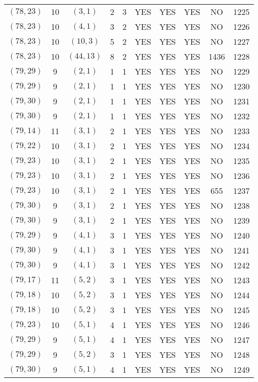 \begin{longtable}{|c|c|c|c|c|c|c|c|c|c|}
$(78, 23)$ & 10 & $(3, 1)$ & 2 & 3 & YES & YES & YES & NO & 1225\\
$(78, 23)$ & 10 & $(4, 1)$ & 3 & 2 & YES & YES & YES & NO & 1226\\
$(78, 23)$ & 10 & $(10, 3)$ & 5 & 2 & YES & YES & YES & NO & 1227\\
$(78, 23)$ & 10 & $(44, 13)$ & 8 & 2 & YES & YES & YES & 1436 & 1228\\
$(79, 29)$ & 9 & $(2, 1)$ & 1 & 1 & YES & YES & YES & NO & 1229\\
$(79, 29)$ & 9 & $(2, 1)$ & 1 & 1 & YES & YES & YES & NO & 1230\\
$(79, 30)$ & 9 & $(2, 1)$ & 1 & 1 & YES & YES & YES & NO & 1231\\
$(79, 30)$ & 9 & $(2, 1)$ & 1 & 1 & YES & YES & YES & NO & 1232\\
$(79, 14)$ & 11 & $(3, 1)$ & 2 & 1 & YES & YES & YES & NO & 1233\\
$(79, 22)$ & 10 & $(3, 1)$ & 2 & 1 & YES & YES & YES & NO & 1234\\
$(79, 23)$ & 10 & $(3, 1)$ & 2 & 1 & YES & YES & YES & NO & 1235\\
$(79, 23)$ & 10 & $(3, 1)$ & 2 & 1 & YES & YES & YES & NO & 1236\\
$(79, 23)$ & 10 & $(3, 1)$ & 2 & 1 & YES & YES & YES & 655 & 1237\\
$(79, 30)$ & 9 & $(3, 1)$ & 2 & 1 & YES & YES & YES & NO & 1238\\
$(79, 30)$ & 9 & $(3, 1)$ & 2 & 1 & YES & YES & YES & NO & 1239\\
$(79, 29)$ & 9 & $(4, 1)$ & 3 & 1 & YES & YES & YES & NO & 1240\\
$(79, 30)$ & 9 & $(4, 1)$ & 3 & 1 & YES & YES & YES & NO & 1241\\
$(79, 30)$ & 9 & $(4, 1)$ & 3 & 1 & YES & YES & YES & NO & 1242\\
$(79, 17)$ & 11 & $(5, 2)$ & 3 & 1 & YES & YES & YES & NO & 1243\\
$(79, 18)$ & 10 & $(5, 2)$ & 3 & 1 & YES & YES & YES & NO & 1244\\
$(79, 18)$ & 10 & $(5, 2)$ & 3 & 1 & YES & YES & YES & NO & 1245\\
$(79, 23)$ & 10 & $(5, 1)$ & 4 & 1 & YES & YES & YES & NO & 1246\\
$(79, 29)$ & 9 & $(5, 1)$ & 4 & 1 & YES & YES & YES & NO & 1247\\
$(79, 29)$ & 9 & $(5, 2)$ & 3 & 1 & YES & YES & YES & NO & 1248\\
$(79, 30)$ & 9 & $(5, 1)$ & 4 & 1 & YES & YES & YES & NO & 1249\\

\end{longtable}
